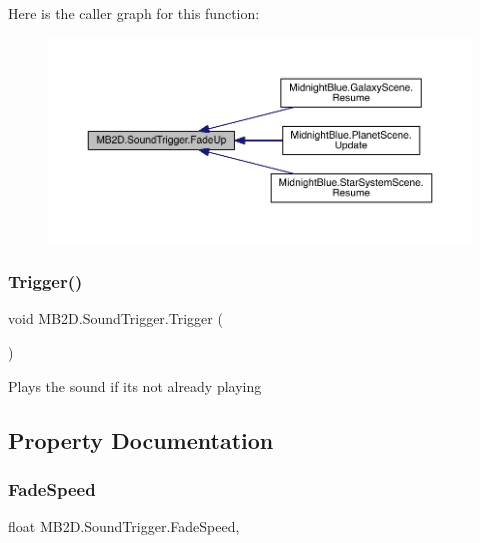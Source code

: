 Here is the caller graph for this function\+:\nopagebreak
\begin{figure}[H]
\begin{center}
\leavevmode
\includegraphics[width=350pt]{class_m_b2_d_1_1_sound_trigger_a677d10464891b21b44da3811430d5bea_icgraph}
\end{center}
\end{figure}
\hypertarget{class_m_b2_d_1_1_sound_trigger_a1387225550eb222ebbf70a8e097907a3}{}\label{class_m_b2_d_1_1_sound_trigger_a1387225550eb222ebbf70a8e097907a3} 
\subsubsection{\texorpdfstring{Trigger()}{Trigger()}}
{\footnotesize\ttfamily void M\+B2\+D.\+Sound\+Trigger.\+Trigger (\begin{DoxyParamCaption}{ }\end{DoxyParamCaption})\hspace{0.3cm}{\ttfamily [inline]}}



Plays the sound if it\textquotesingle{}s not already playing 



\subsection{Property Documentation}
\hypertarget{class_m_b2_d_1_1_sound_trigger_aff38429508a9f7d6d63e21ccb9605c16}{}\label{class_m_b2_d_1_1_sound_trigger_aff38429508a9f7d6d63e21ccb9605c16} 
\subsubsection{\texorpdfstring{Fade\+Speed}{FadeSpeed}}
{\footnotesize\ttfamily float M\+B2\+D.\+Sound\+Trigger.\+Fade\+Speed\hspace{0.3cm}{\ttfamily [get]}, {\ttfamily [set]}}



